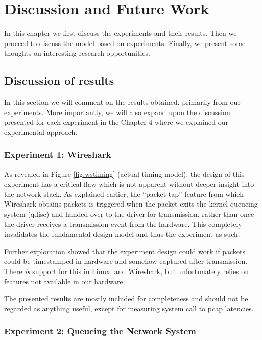 
\chapter{Discussion and Future Work}

In this chapter we first discuss the experiments and their results. Then we
proceed to discuss the model based on experiments. Finally, we present some
thoughts on interesting research opportunities.

\section{Discussion of results}

In this section we will comment on the results obtained, primarily from our
experiments. More importantly, we will also expand upon the discussion
presented for each experiment in the Chapter 4 where we explained our
experimental approach.

\subsection{Experiment 1: Wireshark}

As revealed in Figure \ref{fig:wstiming} (actual timing model), the design of
this experiment has a critical flaw which is not apparent without deeper
insight into the network stack. As explained earlier, the ``packet tap''
feature from which Wireshark obtains packets is triggered when the packet
exits the kernel queueing system (qdisc) and handed over to the driver for
transmission, rather than once the driver receives a transmission event from
the hardware. This completely invalidates the fundamental design model and
thus the experiment as such.

Further exploration showed that the experiment design could work if packets
could be timestamped in hardware and somehow captured after transmission.
There \emph{is} support for this in Linux, and Wireshark, but unfortunately
relies on features not available in our hardware.

The presented results are mostly included for completeness and should not be
regarded as anything useful, except for measuring system call to pcap
latencies.

\subsection{Experiment 2: Queueing the Network System}

